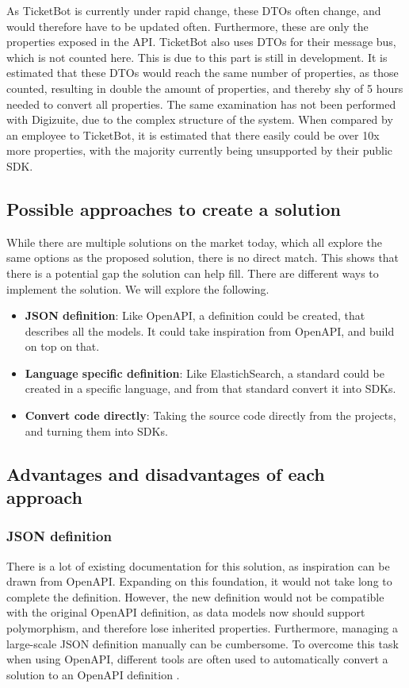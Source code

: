 As TicketBot is currently under rapid change, these DTOs often change, and would therefore have to be updated often.
Furthermore, these are only the properties exposed in the API. TicketBot also uses DTOs for their message bus, which is not counted here. This is due to this part is still in development. It is estimated that these DTOs would reach the same number of properties, as those counted, resulting in double the amount of properties, and thereby shy of 5 hours needed to convert all properties.
The same examination has not been performed with Digizuite, due to the complex structure of the system. When compared by an employee to TicketBot, it is estimated that there easily could be over 10x more properties, with the majority currently being unsupported by their public SDK.

\subsection{Possible approaches to create a solution}
While there are multiple solutions on the market today, which all explore the same options as the proposed solution, there is no direct match. This shows that there is a potential gap the solution can help fill. There are different ways to implement the solution. We will explore the following.
\begin{itemize}
    \item \textbf{JSON definition}: Like OpenAPI, a definition could be created, that describes all the models. It could take inspiration from OpenAPI, and build on top on that.
    
    \item \textbf{Language specific definition}: Like ElastichSearch, a standard could be created in a specific language, and from that standard convert it into SDKs.
    
    \item \textbf{Convert code directly}: Taking the source code directly from the projects, and turning them into SDKs.
\end{itemize}


\subsection{Advantages and disadvantages of each approach}
\subsubsection*{JSON definition}
There is a lot of existing documentation for this solution, as inspiration can be drawn from OpenAPI.
Expanding on this foundation, it would not take long to complete the definition. However, the new definition would not be compatible with the original OpenAPI definition, as data models now should support polymorphism, and therefore lose inherited properties.
Furthermore, managing a large-scale JSON definition manually can be cumbersome. 
To overcome this task when using OpenAPI, different tools are often used to automatically convert a solution to an OpenAPI definition \cite{open-api-tools}.

